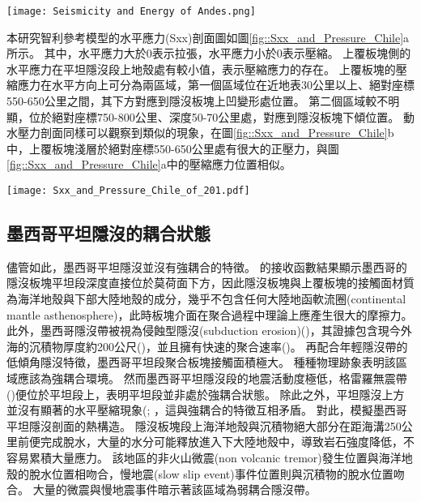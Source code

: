 \begin{figure*}[htp]
    \centering
    \texttt{[image: Seismicity and Energy of Andes.png]}
    \caption[智利沿岸自21$^\circ$S到44$^\circ$S的上板塊地震活動統計分析，摘自\citealp{gutscher2002andean}]{智利沿岸自20$^\circ$S到40$^\circ$S的上板塊地震活動統計分析，摘自\citealp{gutscher2002andean}。這裡採用深度<70公里的地震事件總能量，單位為10$^6$焦耳。右側數字表示1900-1963年/1964-1995年間所示分的地震能量。數字下灰色底框標示出平坦隱沒段的位置。
    }
    \label{fig::Chile_seismicity}
\end{figure*}

本研究智利參考模型的水平應力(Sxx)剖面圖如圖\ref{fig::Sxx_and_Pressure_Chile}a所示。
其中，水平應力大於0表示拉張，水平應力小於0表示壓縮。
上覆板塊側的水平應力在平坦隱沒段上地殼處有較小值，表示壓縮應力的存在。
上覆板塊的壓縮應力在水平方向上可分為兩區域，第一個區域位在近地表30公里以上、絕對座標550-650公里之間，其下方對應到隱沒板塊上凹變形處位置。
第二個區域較不明顯，位於絕對座標750-800公里、深度50-70公里處，對應到隱沒板塊下傾位置。
動水壓力剖面同樣可以觀察到類似的現象，在圖\ref{fig::Sxx_and_Pressure_Chile}b中，上覆板塊淺層於絕對座標550-650公里處有很大的正壓力，與圖\ref{fig::Sxx_and_Pressure_Chile}a中的壓縮應力位置相似。

\begin{figure*}[h]
    \centering
    \texttt{[image: Sxx\_and\_Pressure\_Chile\_of\_201.pdf]}
    \caption[智利參考模型於40 Myr的水平軸差應力與動水壓力剖面]{智利參考模型於40 Myr的水平軸差應力與動水壓力剖面，其中應力正向代表拉張應力，負向代表壓縮應力。}
    \label{fig::Sxx_and_Pressure_Chile}
\end{figure*}
\subsection{墨西哥平坦隱沒的耦合狀態}
儘管如此，墨西哥平坦隱沒並沒有強耦合的特徵。
\citealp{PerezCampos2008}的接收函數結果顯示墨西哥的隱沒板塊平坦段深度直接位於莫荷面下方，因此隱沒板塊與上覆板塊的接觸面材質為海洋地殼與下部大陸地殼的成分，幾乎不包含任何大陸地函軟流圈(continental mantle asthenosphere)，此時板塊介面在聚合過程中理論上應產生很大的摩擦力。
此外，墨西哥隱沒帶被視為侵蝕型隱沒(subduction erosion)(\citealp{stern2011subduction})，其證據包含現今外海的沉積物厚度約200公尺(\citealp{manea2003sediment})，並且擁有快速的聚合速率(\citealp{o2005uncertainties})。
再配合年輕隱沒帶的低傾角隱沒特徵，墨西哥平坦段聚合板塊接觸面積極大。
種種物理跡象表明該區域應該為強耦合環境。
然而墨西哥平坦隱沒段的地震活動度極低，格雷羅無震帶(\citealp{kostoglodov2003large})便位於平坦段上，表明平坦段並非處於強耦合狀態。
除此之外，平坦隱沒上方並沒有顯著的水平壓縮現象(\citealp{nieto2006latest}; \citealp{moran2007cenozoic}，這與強耦合的特徵互相矛盾。
對此，\citealp{Manea2011Thermal}模擬墨西哥平坦隱沒剖面的熱構造。
隱沒板塊段上海洋地殼與沉積物絕大部分在距海溝250公里前便完成脫水，大量的水分可能釋放進入下大陸地殼中，導致岩石強度降低，不容易累積大量應力。
該地區的非火山微震(non volcanic tremor)發生位置與海洋地殼的脫水位置相吻合\citealp{Manea2011Thermal}，慢地震(slow slip event)事件位置則與沉積物的脫水位置吻合\citealp{Song2009}。
大量的微震與慢地震事件暗示著該區域為弱耦合隱沒帶。

